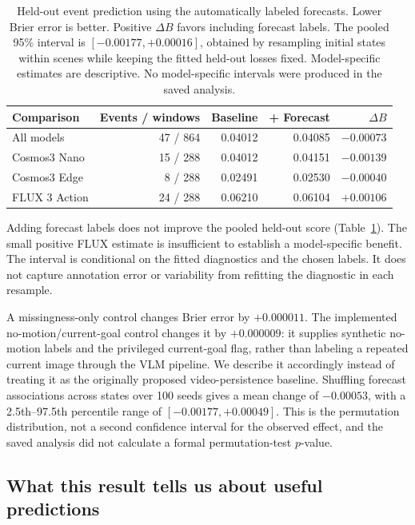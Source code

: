 \documentclass{article}
\begin{document}
\begin{table}[t]
\centering
\small
\begin{tabular}{lrrrr}
\toprule
Comparison & Events / windows & Baseline & + Forecast & $\Delta B$ \\
\midrule
All models & 47 / 864 & 0.04012 & 0.04085 & $-0.00073$ \\
Cosmos3 Nano & 15 / 288 & 0.04012 & 0.04151 & $-0.00139$ \\
Cosmos3 Edge & 8 / 288 & 0.02491 & 0.02530 & $-0.00040$ \\
FLUX 3 Action & 24 / 288 & 0.06210 & 0.06104 & $+0.00106$ \\
\bottomrule
\end{tabular}
\caption{Held-out event prediction using the automatically labeled forecasts. Lower Brier error is better. Positive $\Delta B$ favors including forecast labels. The pooled 95\% interval is $[-0.00177, +0.00016]$, obtained by resampling initial states within scenes while keeping the fitted held-out losses fixed. Model-specific estimates are descriptive. No model-specific intervals were produced in the saved analysis.}
\label{tab:forecast-utility}
\end{table}

Adding forecast labels does not improve the pooled held-out score (Table~\ref{tab:forecast-utility}). The small positive FLUX estimate is insufficient to establish a model-specific benefit. The interval is conditional on the fitted diagnostics and the chosen labels. It does not capture annotation error or variability from refitting the diagnostic in each resample.

A missingness-only control changes Brier error by $+0.000011$. The implemented no-motion/current-goal control changes it by $+0.000009$: it supplies synthetic no-motion labels and the privileged current-goal flag, rather than labeling a repeated current image through the VLM pipeline. We describe it accordingly instead of treating it as the originally proposed video-persistence baseline. Shuffling forecast associations across states over 100 seeds gives a mean change of $-0.00053$, with a 2.5th--97.5th percentile range of $[-0.00177,+0.00049]$. This is the permutation distribution, not a second confidence interval for the observed effect, and the saved analysis did not calculate a formal permutation-test $p$-value.

\subsection{What this result tells us about useful predictions}
\end{document}

